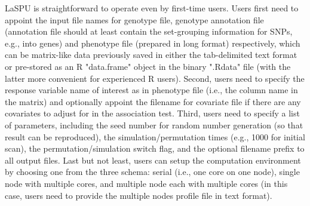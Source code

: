 \documentclass[12pt]{article}
\begin{document}
LaSPU is straightforward to operate even by first-time users. Users first need to appoint the input file names for genotype file, genotype annotation file (annotation file should at least contain the set-grouping information for SNPs, e.g., into genes) and phenotype file (prepared in long format) respectively, which can be matrix-like data previously saved in either the tab-delimited text format or pre-stored as an R "data.frame" object in the binary ".Rdata" file (with the latter more convenient for experienced R users). Second, users need to specify the response variable name of interest as in phenotype file (i.e., the column name in the matrix) and optionally appoint the filename for covariate file if there are any covariates to adjust for in the association test. Third, users need to specify a list of parameters, including the seed number for random number generation (so that result can be reproduced), the simulation/permutation times (e.g., 1000 for initial scan), the permutation/simulation switch flag, and the optional filename prefix to all output files. Last but not least, users can setup the computation environment by choosing one from the three schema: serial (i.e., one core on one node), single node with multiple cores, and multiple node each with multiple cores (in this case, users need to provide the multiple nodes profile file in text format). 
\end{document}
